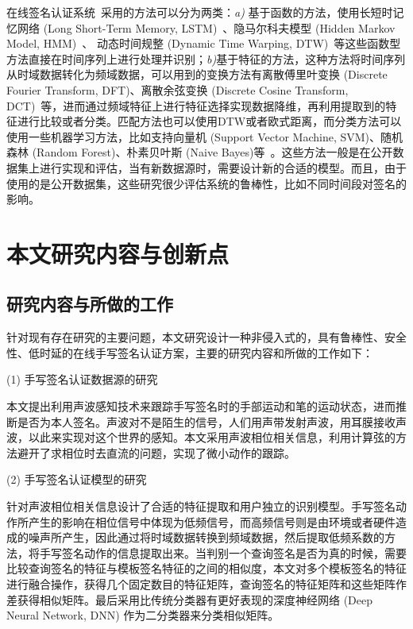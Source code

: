 在线签名认证系统~\cite{李成华基于1}采用的方法可以分为两类：\textit{a)} 基于函数的方法，使用长短时记忆网络 (Long Short-Term Memory, LSTM)~\cite{hochreiter1997long}、隐马尔科夫模型 (Hidden Markov Model, HMM)~\cite{rabiner1986introduction,雷涛隐马尔可夫模型下视频手写签名认证算法研究}、 动态时间规整 (Dynamic Time Warping, DTW)~\cite{鄢晨丹基于统计模型的}等这些函数型方法直接在时间序列上进行处理并识别；\textit{b)}基于特征的方法，这种方法将时间序列从时域数据转化为频域数据，可以用到的变换方法有离散傅里叶变换 (Discrete Fourier Transform, DFT)、离散余弦变换 (Discrete Cosine Transform, DCT)~\cite{李成华基于}等，进而通过频域特征上进行特征选择实现数据降维，再利用提取到的特征进行比较或者分类。匹配方法也可以使用DTW或者欧式距离，而分类方法可以使用一些机器学习方法，比如支持向量机 (Support Vector Machine, SVM)、随机森林 (Random Forest)、朴素贝叶斯 (Naive Bayes)等~\cite{周志华2016机器学习}。这些方法一般是在公开数据集上进行实现和评估，当有新数据源时，需要设计新的合适的模型。而且，由于使用的是公开数据集，这些研究很少评估系统的鲁棒性，比如不同时间段对签名的影响。

\section{本文研究内容与创新点}
\subsection{研究内容与所做的工作}
针对现有存在研究的主要问题，本文研究设计一种非侵入式的，具有鲁棒性、安全性、低时延的在线手写签名认证方案，主要的研究内容和所做的工作如下：

(1) 手写签名认证数据源的研究

本文提出利用声波感知技术来跟踪手写签名时的手部运动和笔的运动状态，进而推断是否为本人签名。声波对不是陌生的信号，人们用声带发射声波，用耳膜接收声波，以此来实现对这个世界的感知。本文采用声波相位相关信息，利用计算弦的方法避开了求相位时去直流的问题，实现了微小动作的跟踪。


(2) 手写签名认证模型的研究

针对声波相位相关信息设计了合适的特征提取和用户独立的识别模型。手写签名动作所产生的影响在相位信号中体现为低频信号，而高频信号则是由环境或者硬件造成的噪声所产生，因此通过将时域数据转换到频域数据，然后提取低频系数的方法，将手写签名动作的信息提取出来。当判别一个查询签名是否为真的时候，需要比较查询签名的特征与模板签名特征的之间的相似度，本文对多个模板签名的特征进行融合操作，获得几个固定数目的特征矩阵，查询签名的特征矩阵和这些矩阵作差获得相似矩阵。最后采用比传统分类器有更好表现的深度神经网络 (Deep Neural Network, DNN)\cite{Schmidhuber2015Deep} 作为二分类器来分类相似矩阵。

